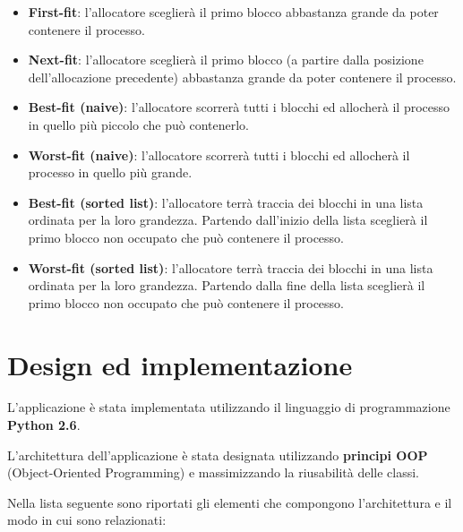 \documentclass[12pt]{report}
\renewcommand\emph{\textbf}
\begin{document}
        \begin{itemize}
            \item \emph{First-fit}: l'allocatore sceglierà il primo blocco abbastanza grande da poter contenere il processo.
            \item \emph{Next-fit}: l'allocatore sceglierà il primo blocco (a partire dalla posizione dell'allocazione precedente) abbastanza grande da poter contenere il processo.
            \item \emph{Best-fit (naive)}: l'allocatore scorrerà tutti i blocchi ed allocherà il processo in quello più piccolo che può contenerlo.
            \item \emph{Worst-fit (naive)}: l'allocatore scorrerà tutti i blocchi ed allocherà il processo in quello più grande.
            \item \emph{Best-fit (sorted list)}: l'allocatore terrà traccia dei blocchi in una lista ordinata per la loro grandezza. Partendo dall'inizio della lista sceglierà il primo blocco non occupato che può contenere il processo.
            \item \emph{Worst-fit (sorted list)}: l'allocatore terrà traccia dei blocchi in una lista ordinata per la loro grandezza. Partendo dalla fine della lista sceglierà il primo blocco non occupato che può contenere il processo.
        \end{itemize}        

    \section{Design ed implementazione}
        L'applicazione è stata implementata utilizzando il linguaggio di programmazione \emph{Python 2.6}.

        L'architettura dell'applicazione è stata designata utilizzando \emph{principi OOP} (Object-Oriented Programming) e massimizzando la riusabilità delle classi.

        Nella lista seguente sono riportati gli elementi che compongono l'architettura e il modo in cui sono relazionati:
\end{document}
